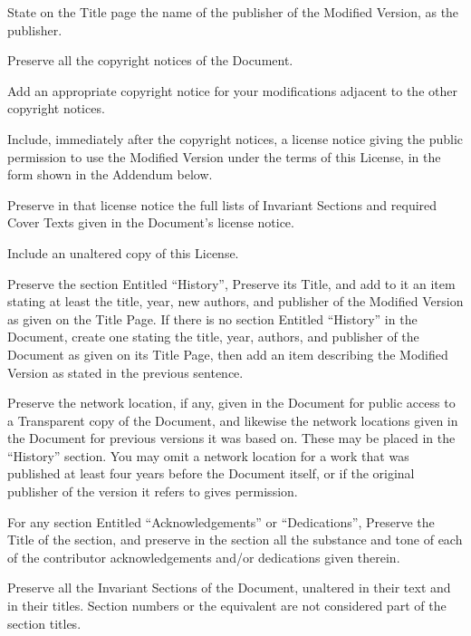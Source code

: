 \item
State on the Title page the name of the publisher of the Modified Version, as the publisher.

\item
Preserve all the copyright notices of the Document.

\item
Add an appropriate copyright notice for your modifications adjacent to the other copyright notices.

\item
Include, immediately after the copyright notices, a license notice giving the public permission to use the Modified Version under the terms of this License, in the form shown in the Addendum below.

\item
Preserve in that license notice the full lists of Invariant Sections and required Cover Texts given in the Document's license notice.

\item
Include an unaltered copy of this License.

\item
Preserve the section Entitled ``History'', Preserve its Title, and add to it an item stating at least the title, year, new authors, and publisher of the Modified Version as given on the Title Page.  If there is no section Entitled ``History'' in the Document, create one stating the title, year, authors, and publisher of the Document as given on its Title Page, then add an item describing the Modified Version as stated in the previous sentence.

\item
Preserve the network location, if any, given in the Document for public access to a Transparent copy of the Document, and likewise the network locations given in the Document for previous versions it was based on.  These may be placed in the ``History'' section. You may omit a network location for a work that was published at least four years before the Document itself, or if the original publisher of the version it refers to gives permission.

\item
For any section Entitled ``Acknowledgements'' or ``Dedications'', Preserve the Title of the section, and preserve in the section all the substance and tone of each of the contributor acknowledgements and/or dedications given therein.

\item
Preserve all the Invariant Sections of the Document, unaltered in their text and in their titles.  Section numbers or the equivalent are not considered part of the section titles.

